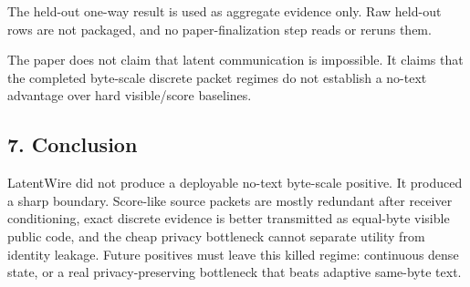 \documentclass{article}
\begin{document}
The held-out one-way result is used as aggregate evidence only. Raw
held-out rows are not packaged, and no paper-finalization step reads or
reruns them.

The paper does not claim that latent communication is impossible. It
claims that the completed byte-scale discrete packet regimes do not
establish a no-text advantage over hard visible/score baselines.

\hypertarget{conclusion}{%
\subsection{7. Conclusion}\label{conclusion}}

LatentWire did not produce a deployable no-text byte-scale positive. It
produced a sharp boundary. Score-like source packets are mostly
redundant after receiver conditioning, exact discrete evidence is better
transmitted as equal-byte visible public code, and the cheap privacy
bottleneck cannot separate utility from identity leakage. Future
positives must leave this killed regime: continuous dense state, or a
real privacy-preserving bottleneck that beats adaptive same-byte text.




\end{document}
